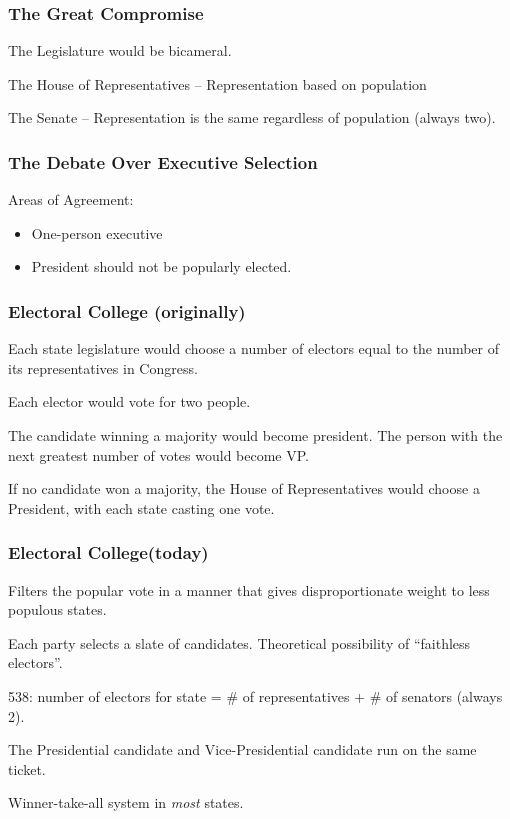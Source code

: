 \subsubsection{The Great Compromise}
The Legislature would be bicameral.

The House of Representatives -- Representation based on population

The Senate -- Representation is the same regardless of population (always two).
\subsubsection{The Debate Over Executive Selection}
Areas of Agreement:
\begin{itemize}
    \item One-person executive
    \item President should not be popularly elected.
\end{itemize}
\subsubsection{Electoral College (originally)}
Each state legislature would choose a number of electors equal to the number of its representatives in Congress.

Each elector would vote for two people.

The candidate winning a majority would become president. The person with the next greatest number of votes would become VP.

If no candidate won a majority, the House of Representatives would choose a President, with each state casting one vote.

\subsubsection{Electoral College(today)}
Filters the popular vote in a manner that gives disproportionate weight to less populous states.

Each party selects a slate of candidates. Theoretical possibility of ``faithless electors''.

538: number of electors for state = \# of representatives + \# of senators (always 2).

The Presidential candidate and Vice-Presidential candidate run on the same ticket.

Winner-take-all system in \textit{most} states.

